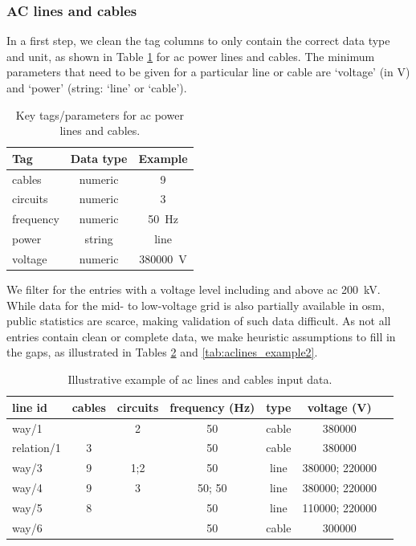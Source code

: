 \documentclass[fleqn,10pt]{wlscirep}
\begin{document}
\subsubsection*{AC lines and cables} In a first step, we clean the tag columns to only contain the correct data type and unit, as shown in Table \ref{tab:aclines_params} for \acrshort{ac} power lines and cables. The minimum parameters that need to be given for a particular line or cable are `voltage' (in \si{\volt}) and `power' (string: `line' or `cable').
% 
\begin{table}[ht]
    \centering
    \begin{tabular}{|l|c|c|}
    \hline
    \textbf{Tag} & \textbf{Data type} & \textbf{Example} \\
    \hline
    cables & numeric & 9 \\
    \hline
    circuits & numeric & 3 \\
    \hline
    frequency & numeric & \SI{50}{\hertz} \\
    \hline
    power & string & line \\
    \hline
    voltage & numeric & \SI{380000}{\volt} \\
    \hline
    \end{tabular}
    \caption{Key tags/parameters for \acrshort{ac} power lines and cables.}
    \label{tab:aclines_params} 
\end{table}

We filter for the entries with a voltage level including and above \acrshort{ac} \SI{200}{\kilo\volt}. While data for the mid- to low-voltage grid is also partially available in \gls{osm}, public statistics are scarce, making validation of such data difficult. As not all entries contain clean or complete data, we make heuristic assumptions to fill in the gaps, as illustrated in Tables \ref{tab:aclines_example1} and \ref{tab:aclines_example2}. 

\begin{table}[!htbp]
    \centering
    \begin{tabular}{|l|c|c|c|c|c|c|}
    \hline
    \textbf{line id} & \textbf{cables} & \textbf{circuits} & \textbf{frequency} (Hz) & \textbf{type} & \textbf{voltage}  (V) \\
    \hline
    way/1 &  & 2 & 50 & cable & \SI{380000}{} \\
    \hline
    relation/1 & 3 &  & 50 & cable & \SI{380000}{} \\
    \hline
    way/3 & 9 & 1;2 & 50 & line & \SI{380000}{}; \SI{220000}{} \\
    \hline
    way/4 & 9 & 3 & 50; 50 & line & \SI{380000}{}; \SI{220000}{} \\
    \hline
    way/5 & 8 &  & 50 & line & \SI{110000}{}; \SI{220000}{} \\
    \hline
    way/6 &  &  & 50 & cable & \SI{300000}{}\\
    \hline
    \end{tabular}
    \caption{Illustrative example of \acrshort{ac} lines and cables input data.}
    \label{tab:aclines_example1}
\end{table}
\end{document}
